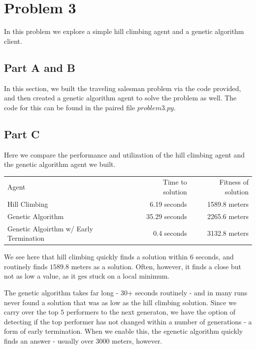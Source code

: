 \documentclass{article}
\begin{document}
\section*{Problem 3}

In this problem we explore a simple hill climbing agent and a genetic algorithm client.

\subsection*{Part A and B}

In this section, we built the traveling salesman problem via the code provided, and then created a genetic algorithm agent to solve the problem as well. The code for this can be found in the paired file $problem3.py$.

\subsection*{Part C}

Here we compare the performance and utilization of the hill climbing agent and the genetic algorithm agent we built.

\begin{center}
    \begin{tabular}{ l r r }
         Agent &     Time to solution &    Fitness of solution \\ 
        Hill Climbing & 6.19 seconds &        1589.8 meters \\  
        Genetic Algorithm & 35.29 seconds  &      2265.6 meters  \\
        Genetic Algoirthm w/ Early Termination & 0.4 seconds & 3132.8 meters \\
    \end{tabular}
\end{center}

We see here that hill climbing quickly finds a solution within 6 seconds, and routinely finds $1589.8$ meters as a solution. Often, however, it finds a close but not as low a value, as it ges stuck on a local minimum.

The genetic algorithm takes far long - 30+ seconds routinely - and in many runs never found a solution that was as low as the hill climbing solution. Since we carry over the top $5$ performers to the next generaton, we have the option of detecting if the top performer has not changed within a number of generations - a form of early termination. When we enable this, the egenetic algorithm quickly finds an answer - usually over 3000 meters, however.
\end{document}
